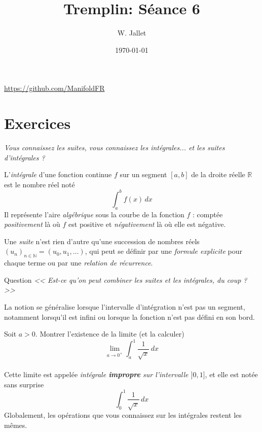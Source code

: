 \documentclass{beamer}
\title{{\sffamily Tremplin: Séance 6}}
\date{\today}
\author{W. Jallet}
\newcommand{\RR}{\mathbb R}
\newcommand{\NN}{\mathbb N}
\theoremstyle{plain}
\begin{document}
	
\begin{frame}
	\maketitle
	\url{https://github.com/ManifoldFR}
\end{frame}

\section*{Exercices}

\begin{frame}

\textit{Vous connaissez les suites, vous connaissez les intégrales... et les suites d'intégrales ?}

L'\textit{intégrale} d'une fonction continue $f$ sur un segment $[a,b]$ de la droite réelle $\RR$ est le nombre réel noté
\[
\int_a^b f(x)\,dx
\]
Il représente l'aire \textit{algébrique} sous la courbe de la fonction $f$ : comptée \textit{positivement} là où $f$ est positive et \textit{négativement} là où elle est négative.
\end{frame}

\begin{frame}
Une \textit{suite} n'est rien d'autre qu'une succession de nombres réels $(u_n)_{n\in\NN} = (u_0,u_1,\ldots)$, qui peut se définir par une \textit{formule explicite} pour chaque terme ou par une \textit{relation de récurrence}.

\end{frame}

\begin{frame}{Question}
	\textit{<< Est-ce qu'on peut combiner les suites et les intégrales, du coup ? >>}
\end{frame}

\begin{frame}{}
La notion se généralise lorsque l'intervalle d'intégration n'est pas un segment, notamment lorsqu'il est infini ou lorsque la fonction n'est pas défini en son bord.

Soit $a > 0$. Montrer l'existence de la limite (et la calculer) 
\[
\lim_{a\to 0^+} \int_a^1 \frac 1{\sqrt{x}}\,dx
\]\\
Cette limite est appelée \textit{intégrale \textbf{impropre} sur l'intervalle $]0,1]$}, et elle est notée sans surprise
\[
\int_0^1 \frac 1{\sqrt{x}}\,dx
\]
Globalement, les opérations que vous connaissez sur les intégrales restent les mêmes.

\end{frame}
\end{document}
